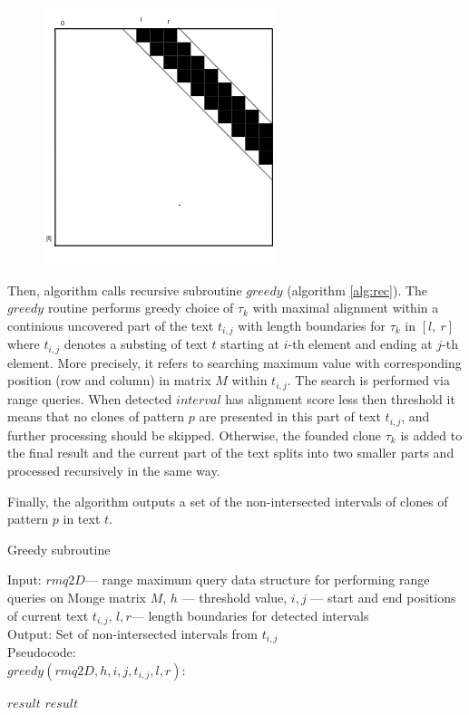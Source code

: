 \begin{figure}[H]
  \centering
    \includegraphics[width=0.4\columnwidth]{figures/M1.png}
    \caption{}\label{figures:M2}
\end{figure}

Then, algorithm calls recursive subroutine $greedy$ (algorithm \ref{alg:rec}).
The $greedy$ routine performs greedy choice of $\tau_{k}$ with maximal alignment within a continious uncovered part of the text $t_{i,j}$ with length boundaries for $\tau_{k}$ in $[l,\ r]$ where $t_{i,j}$ denotes a substing of text $t$ starting at $i$-th element and ending at $j$-th element.
More precisely, it refers to searching maximum value with corresponding position (row and column) in matrix $M$ within $t_{i,j}$.
The search is performed via range queries.
When detected $interval$ has alignment score less then threshold it means that no clones of pattern $p$ are presented in this part of text $t_{i,j}$, and further processing should be skipped.
Otherwise, the founded clone $\tau_k$ is added to the final result and the current part of the text splits into two smaller parts and processed recursively in the same way.

Finally, the algorithm outputs a set of the non-intersected intervals of clones of pattern $p$ in text $t$.


\begin{algorithm}[H]
\caption{Greedy subroutine}
\label{alg:rec}
Input: $rmq2D$--- range maximum query data structure for performing range queries on Monge matrix $M$, $h$ --- threshold value, $i,j$ --- start and end positions of current text $t_{i,j}$, $l,r$--- length boundaries for detected intervals \\
Output: Set of non-intersected intervals from $t_{i,j}$\\
Pseudocode:\\
$greedy(rmq2D,h, i, j, t_{i,j},l,r ):$

\begin{algorithmic}[1]
\RETURN $result$
\ENDIF
{}
\ENDIF
{}
\ENDIF
\RETURN $result$
\end{algorithmic}
\end{algorithm}


